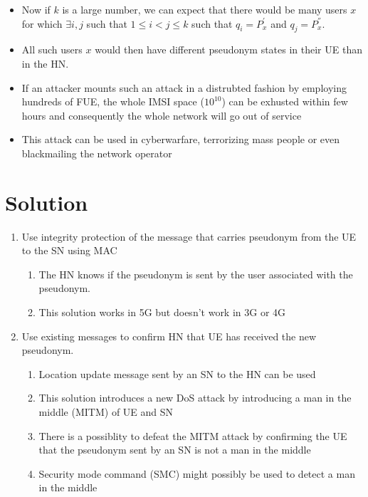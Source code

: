 \documentclass[portrait,a0]{a0poster}
\begin{document}
\begin{multicols}{2}
\begin{itemize}
\item Now if $k$ is a large number, we can expect that there would be many users $x$ for which $\exists i,j$ such that $1 \leq i < j \leq k$ such that $q_i=P_x^{'}$ and $q_j=P_x^{''}$.
\item  All such users $x$ would then have different pseudonym states in their UE than in the HN.
\item If an attacker mounts such an attack in a distrubted fashion by employing hundreds of FUE, the whole IMSI space ($10^{10}$) can be exhusted within few hours and consequently the whole network will go out of service
\item This attack can be used in cyberwarfare, terrorizing mass people or even blackmailing the network operator
\end{itemize}

\section{Solution}
\begin{enumerate}
\item Use integrity protection of the message that carries pseudonym from the UE to the SN using MAC 
\begin{enumerate}
\item The HN knows if the pseudonym is sent by the user associated with the pseudonym.
\item This solution works in 5G but doesn't work in 3G or 4G  
\end{enumerate}
\item Use existing messages to confirm HN that UE has received the new pseudonym.
\begin{enumerate}
\item Location update message sent by an SN to the HN can be used 
\item This solution introduces a new DoS attack by introducing a man in the middle (MITM) of UE and SN
\item There is a possiblity to defeat the MITM attack by confirming the UE that the pseudonym sent by an SN is not a man in the middle
\item Security mode command (SMC) might possibly be used to detect a man in the middle 
\end{enumerate}
\end{enumerate}


\end{multicols}
\end{document}
